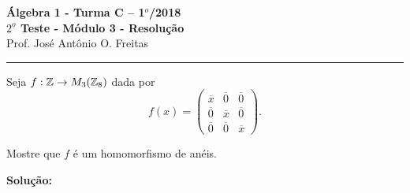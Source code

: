 \documentclass[12pt]{article}
\begin{document}


\begin{center}
{\Large\bf {\'A}lgebra 1 - Turma C -- 1$^{o}$/2018} \\ \vspace{9pt} {\large\bf
  $2^{\underline{o}}$ Teste - Módulo 3 - Resolu\c{c}\~ao}\\
\vspace{9pt} Prof. Jos{\'e} Ant{\^o}nio O. Freitas
\end{center}
\hrule

\vspace{.6cm}

Seja $f : \mathbb{Z} \to M_3(\mathbb{Z}_8)$ dada por
\[
	f(x) = \begin{pmatrix}
		\overline{x} & \overline{0} & \overline{0}\\
		\overline{0} & \overline{x} & \overline{0}\\
		\overline{0} & \overline{0} & \overline{x}
	\end{pmatrix}.
\]

\questao Mostre que $f$ é um homomorfismo de anéis.

\noindent\textbf{Solu\c{c}\~ao:}
\end{document}
